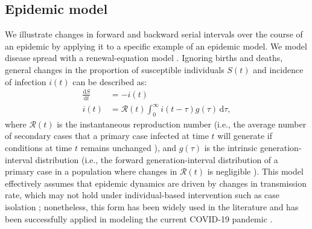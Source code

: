 \documentclass[12pt]{article}
\newcommand{\RR}{\ensuremath{{\mathcal R}}\xspace}
\newcommand{\dd}[1]{\ensuremath{\, \mathrm{d}#1}}
\newcommand{\dtau}{\dd{\tau}}
\newcommand{\gdist}{g} %
\begin{document}
\subsection{Epidemic model}

We illustrate changes in forward and backward serial intervals over the course of an epidemic by applying it to a specific example of an epidemic model.
We model disease spread with a renewal-equation model \citep{heesterbeek1996concept, diekmann2000mathematical, roberts2004modelling, aldis2005integral, roberts2007model, champredon2018equivalence}.
Ignoring births and deaths, general changes in the proportion of susceptible individuals $S(t)$ and incidence of infection $i(t)$ can be described as:
\begin{align}
\frac{\mathrm{d}S}{\mathrm{d}t} &= - i(t)\nonumber\\
i(t) &= \RR(t) \int_0^\infty i(t-\tau) \gdist(\tau) \dtau,
\label{eq:renewal}
\end{align}
where $\RR(t)$ is the instantaneous reproduction number (i.e., the average number of secondary cases that a primary case infected at time $t$ will generate if conditions at time $t$ remains unchanged \citep{fraser2007estimating}), and $\gdist(\tau)$ is the intrinsic generation-interval distribution (i.e., the forward generation-interval distribution of a primary case in a population where changes in $\RR(t)$ is negligible \citep{champredon2015intrinsic}).
This model effectively assumes that epidemic dynamics are driven by changes in transmission rate, which may not hold under individual-based intervention such as case isolation \citep{fraser2007estimating};
nonetheless, this form has been widely used in the literature and has been successfully applied in modeling the current COVID-19 pandemic \citep{gostic2020practical}.
\end{document}
